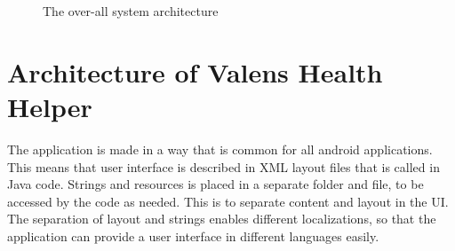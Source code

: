 \begin{figure}[p]

\setlength\fboxsep{0pt}
\setlength\fboxrule{1pt}\noindent{}
\label{fig:Architecture}
\caption{The over-all system architecture}
\end{figure}


\section{Architecture of Valens Health Helper}
The application is made in a way that is common for all android applications. This means that user interface is described in XML layout files that is called in Java code. Strings and resources is placed in a separate folder and file, to be accessed by the code as needed. This is to separate content and layout in the UI. The separation of layout and strings enables different localizations, so that the application can provide a user interface in different languages easily.

